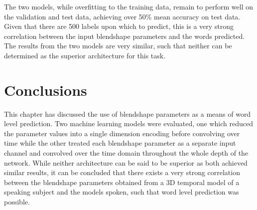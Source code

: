The two models, while overfitting to the training data, remain to perform well on the validation and test data, achieving over 50\% mean accuracy on test data.
Given that there are 500 labels upon which to predict, this is a very strong correlation between the input blendshape parameters and the words predicted.
The results from the two models are very similar, such that neither can be determined as the superior architecture for this task.

\section{Conclusions}
This chapter has discussed the use of blendshape parameters as a means of word level prediction.
Two machine learning models were evaluated, one which reduced the parameter values into a single dimension encoding before convolving over time while the other treated each blendshape parameter as a separate input channel and convolved over the time domain throughout the whole depth of the network.
While neither architecture can be said to be superior as both achieved similar results, it can be concluded that there exists a very strong correlation between the blendshape parameters obtained from a 3D temporal model of a speaking subject and the models spoken, such that word level prediction was possible.
